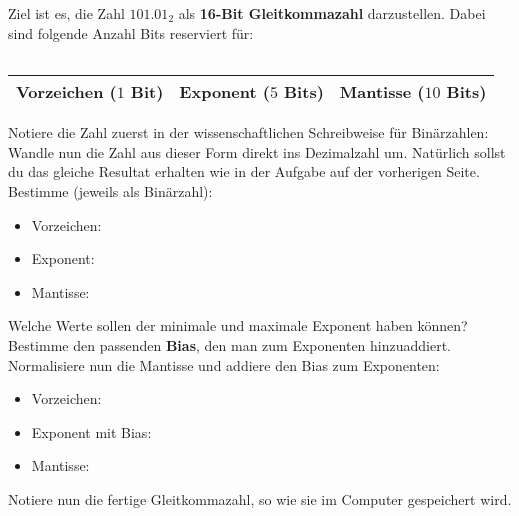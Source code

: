 \begin{question}
	Ziel ist es, die Zahl $101.01_2$ als \textbf{16-Bit Gleitkommazahl} darzustellen. Dabei sind folgende Anzahl Bits reserviert für:
	\begin{table}[H]
		\centering
		\renewcommand{\arraystretch}{1.5}
		\begin{tabular}{|c|c|c|c|c|c|c|c|c|c|c|c|c|c|c|c|}
		\hline
		\cellcolor{blue!25}  \phantom{bl}& 
		\cellcolor{green!25} \phantom{bl}& 
		\cellcolor{green!25} \phantom{bl}& 
		\cellcolor{green!25} \phantom{bl}& 
		\cellcolor{green!25} \phantom{bl}& 
		\cellcolor{green!25} \phantom{bl}& 
		\cellcolor{red!25}   \phantom{bl}& 
		\cellcolor{red!25}   \phantom{bl}& 
		\cellcolor{red!25}   \phantom{bl}& 
		\cellcolor{red!25}   \phantom{bl}& 
		\cellcolor{red!25}   \phantom{bl}& 
		\cellcolor{red!25}   \phantom{bl}& 
		\cellcolor{red!25}   \phantom{bl}& 
		\cellcolor{red!25}   \phantom{bl}& 
		\cellcolor{red!25}   \phantom{bl}& 
		\cellcolor{red!25}   \phantom{bl}\\ \hline
		\end{tabular}
	\end{table}
	\begin{table}[H]
		\centering
		\renewcommand{\arraystretch}{1.5}
		\begin{tabular}{|c|c|c|}
		\hline
		\cellcolor{blue!25} Vorzeichen ($1$ Bit) & 
		\cellcolor{green!25} Exponent ($5$ Bits) &
		\cellcolor{red!25} Mantisse ($10$ Bits) \\ \hline
		\end{tabular}
	\end{table}
	\begin{tasks}
		\task Notiere die Zahl zuerst in der wissenschaftlichen Schreibweise für Binärzahlen:
		\task Wandle nun die Zahl aus dieser Form direkt ins Dezimalzahl um. Natürlich sollst du das gleiche Resultat erhalten wie in der Aufgabe auf der vorherigen Seite.
		\task Bestimme (jeweils als Binärzahl):
		\begin{itemize}
			\item Vorzeichen:
			\item Exponent:
			\item Mantisse:
		\end{itemize}
		\task Welche Werte sollen der minimale und maximale Exponent haben können? Bestimme den passenden \textbf{Bias}, den man zum Exponenten hinzuaddiert.
		\task Normalisiere nun die Mantisse und addiere den Bias zum Exponenten:
		\begin{itemize}
			\item Vorzeichen:
			\item Exponent mit Bias:
			\item Mantisse:
		\end{itemize}
		\task Notiere nun die fertige Gleitkommazahl, so wie sie im Computer gespeichert wird.
	\end{tasks}
\end{question}
